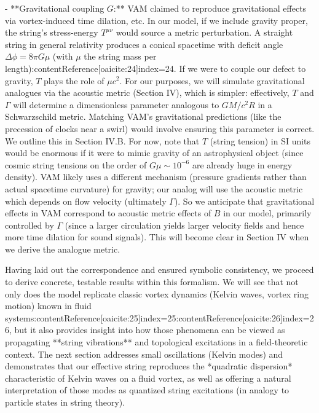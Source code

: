 \documentclass[12pt]{article}
\begin{document}
- **Gravitational coupling $G$:** VAM claimed to reproduce gravitational effects via vortex-induced time dilation, etc. In our model, if we include gravity proper, the string’s stress-energy $T^{\mu\nu}$ would source a metric perturbation. A straight string in general relativity produces a conical spacetime with deficit angle $ \Delta \phi = 8\pi G \mu$ (with $\mu$ the string mass per length):contentReference[oaicite:24]{index=24}. If we were to couple our defect to gravity, $T$ plays the role of $\mu c^2$. For our purposes, we will simulate gravitational analogues via the acoustic metric (Section IV), which is simpler: effectively, $T$ and $\Gamma$ will determine a dimensionless parameter analogous to $GM/c^2R$ in a Schwarzschild metric. Matching VAM’s gravitational predictions (like the precession of clocks near a swirl) would involve ensuring this parameter is correct. We outline this in Section IV.B. For now, note that $T$ (string tension) in SI units would be enormous if it were to mimic gravity of an astrophysical object (since cosmic string tensions on the order of $G\mu \sim 10^{-6}$ are already huge in energy density). VAM likely uses a different mechanism (pressure gradients rather than actual spacetime curvature) for gravity; our analog will use the acoustic metric which depends on flow velocity (ultimately $\Gamma$). So we anticipate that gravitational effects in VAM correspond to acoustic metric effects of $B$ in our model, primarily controlled by $\Gamma$ (since a larger circulation yields larger velocity fields and hence more time dilation for sound signals). This will become clear in Section IV when we derive the analogue metric. 

Having laid out the correspondence and ensured symbolic consistency, we proceed to derive concrete, testable results within this formalism. We will see that not only does the model replicate classic vortex dynamics (Kelvin waves, vortex ring motion) known in fluid systems:contentReference[oaicite:25]{index=25}:contentReference[oaicite:26]{index=26}, but it also provides insight into how those phenomena can be viewed as propagating **string vibrations** and topological excitations in a field-theoretic context. The next section addresses small oscillations (Kelvin modes) and demonstrates that our effective string reproduces the *quadratic dispersion* characteristic of Kelvin waves on a fluid vortex, as well as offering a natural interpretation of those modes as quantized string excitations (in analogy to particle states in string theory).
\end{document}
